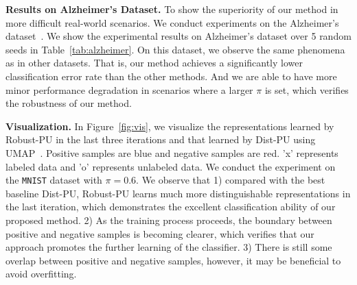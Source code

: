 \documentclass[sigconf]{acmart}
\newcommand{\ourmethod}{Robust-PU\xspace}
\begin{document}
\begin{table}[htbp]
    \caption{Classification errors of \ourmethod on Alzheimer's Dataset.}
    \centering
    \label{tab:alzheimer}
\end{table}

\textbf{Results on Alzheimer's Dataset.}
To show the superiority of our method in more difficult real-world scenarios. We conduct experiments on the Alzheimer’s dataset~\cite{zhao2022dist,chen2020self}. We show the experimental results on Alzheimer's dataset over 5 random seeds in Table~\ref{tab:alzheimer}. On this dataset, we observe the same phenomena as in other datasets. That is, our method achieves a significantly lower classification error rate than the other methods. And we are able to have more minor performance degradation in scenarios where a larger $\pi$ is set, which verifies the robustness of our method.

\textbf{Visualization.}
In Figure~\ref{fig:vis}, we visualize the representations learned by  \ourmethod in the last three iterations and that learned by Dist-PU using UMAP~\cite{mcinnes2018umap}. Positive samples are blue and negative samples are red. 'x' represents labeled data and 'o' represents unlabeled data. We conduct the experiment on the \texttt{MNIST} dataset with $\pi=0.6$. We observe that 1) compared with the best baseline Dist-PU, \ourmethod learns much more distinguishable representations in the last iteration, which demonstrates the excellent classification ability of our proposed method. 2) As the training process proceeds, the boundary between positive and negative samples is becoming clearer, which verifies that our approach promotes the further learning of the classifier. 3) There is still some overlap between positive and negative samples, however, it may be beneficial to avoid overfitting.
\end{document}
